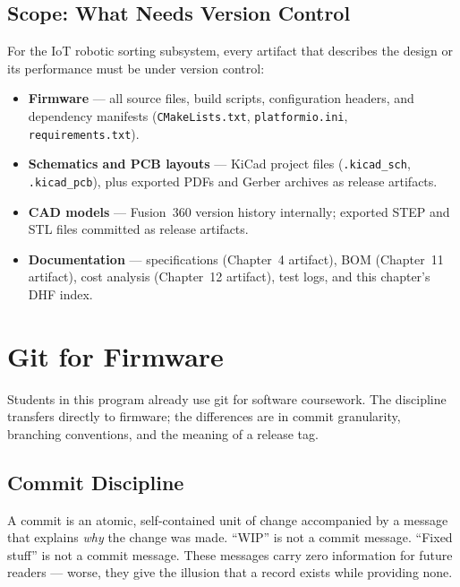 \subsection{Scope: What Needs Version Control}
\label{subsec:ch13-scope}

For the IoT robotic sorting subsystem, every artifact that
describes the design or its performance must be under version control:

\begin{itemize}
  \item \textbf{Firmware} --- all source files, build scripts, configuration headers, and
        dependency manifests (\texttt{CMakeLists.txt}, \texttt{platformio.ini},
        \texttt{requirements.txt}).
  \item \textbf{Schematics and PCB layouts} --- KiCad project files
        (\texttt{.kicad\_sch}, \texttt{.kicad\_pcb}), plus exported PDFs and Gerber
        archives as release artifacts.
  \item \textbf{CAD models} --- Fusion~360 version history internally; exported STEP and
        STL files committed as release artifacts.
  \item \textbf{Documentation} --- specifications (Chapter~4 artifact), BOM
        (Chapter~11 artifact), cost analysis (Chapter~12 artifact), test logs, and this
        chapter's DHF index.
\end{itemize}

\section{Git for Firmware}
\label{sec:ch13-git-firmware}

Students in this program already use git for software
coursework.
The discipline transfers directly to firmware; the differences are in commit granularity,
branching conventions, and the meaning of a release tag.

\subsection{Commit Discipline}
\label{subsec:ch13-commit-discipline}

A commit is an atomic, self-contained unit of change accompanied
by a message that explains \emph{why} the change was made.
``WIP'' is not a commit message.
``Fixed stuff'' is not a commit message.
These messages carry zero information for future readers --- worse, they give the illusion that a record exists while providing none.

